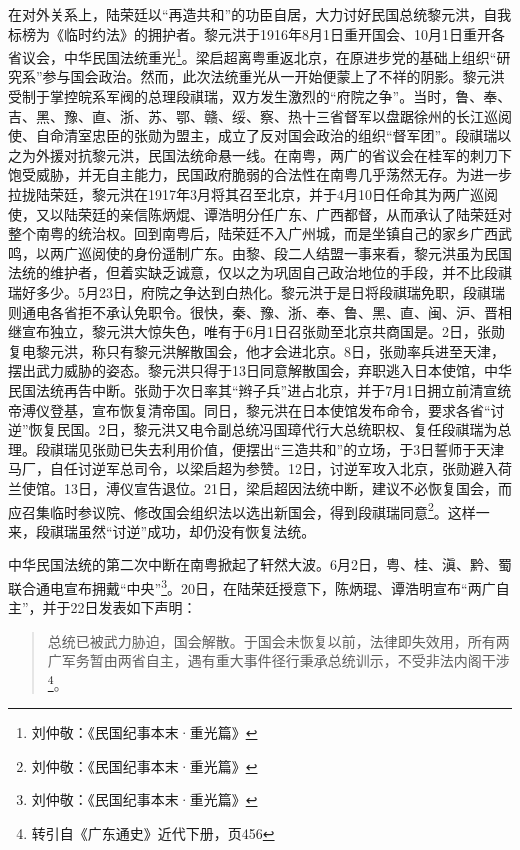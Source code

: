 在对外关系上，陆荣廷以“再造共和”的功臣自居，大力讨好民国总统黎元洪，自我标榜为《临时约法》的拥护者。黎元洪于1916年8月1日重开国会、10月1日重开各省议会，中华民国法统重光\footnote{刘仲敬：《民国纪事本末·重光篇》}。梁启超离粤重返北京，在原进步党的基础上组织“研究系”参与国会政治。然而，此次法统重光从一开始便蒙上了不祥的阴影。黎元洪受制于掌控皖系军阀的总理段祺瑞，双方发生激烈的“府院之争”。当时，鲁、奉、吉、黑、豫、直、浙、苏、鄂、赣、绥、察、热十三省督军以盘踞徐州的长江巡阅使、自命清室忠臣的张勋为盟主，成立了反对国会政治的组织“督军团”。段祺瑞以之为外援对抗黎元洪，民国法统命悬一线。在南粤，两广的省议会在桂军的刺刀下饱受威胁，并无自主能力，民国政府脆弱的合法性在南粤几乎荡然无存。为进一步拉拢陆荣廷，黎元洪在1917年3月将其召至北京，并于4月10日任命其为两广巡阅使，又以陆荣廷的亲信陈炳焜、谭浩明分任广东、广西都督，从而承认了陆荣廷对整个南粤的统治权。回到南粤后，陆荣廷不入广州城，而是坐镇自己的家乡广西武鸣，以两广巡阅使的身份遥制广东。由黎、段二人结盟一事来看，黎元洪虽为民国法统的维护者，但着实缺乏诚意，仅以之为巩固自己政治地位的手段，并不比段祺瑞好多少。5月23日，府院之争达到白热化。黎元洪于是日将段祺瑞免职，段祺瑞则通电各省拒不承认免职令。很快，秦、豫、浙、奉、鲁、黑、直、闽、沪、晋相继宣布独立，黎元洪大惊失色，唯有于6月1日召张勋至北京共商国是。2日，张勋复电黎元洪，称只有黎元洪解散国会，他才会进北京。8日，张勋率兵进至天津，摆出武力威胁的姿态。黎元洪只得于13日同意解散国会，弃职逃入日本使馆，中华民国法统再告中断。张勋于次日率其“辫子兵”进占北京，并于7月1日拥立前清宣统帝溥仪登基，宣布恢复清帝国。同日，黎元洪在日本使馆发布命令，要求各省“讨逆”恢复民国。2日，黎元洪又电令副总统冯国璋代行大总统职权、复任段祺瑞为总理。段祺瑞见张勋已失去利用价值，便摆出“三造共和”的立场，于3日誓师于天津马厂，自任讨逆军总司令，以梁启超为参赞。12日，讨逆军攻入北京，张勋避入荷兰使馆。13日，溥仪宣告退位。21日，梁启超因法统中断，建议不必恢复国会，而应召集临时参议院、修改国会组织法以选出新国会，得到段祺瑞同意\footnote{刘仲敬：《民国纪事本末·重光篇》}。这样一来，段祺瑞虽然“讨逆”成功，却仍没有恢复法统。

中华民国法统的第二次中断在南粤掀起了轩然大波。6月2日，粤、桂、滇、黔、蜀联合通电宣布拥戴“中央”\footnote{刘仲敬：《民国纪事本末·重光篇》}。20日，在陆荣廷授意下，陈炳琨、谭浩明宣布“两广自主”，并于22日发表如下声明：

\begin{quote}

总统已被武力胁迫，国会解散。于国会未恢复以前，法律即失效用，所有两广军务暂由两省自主，遇有重大事件径行秉承总统训示，不受非法内阁干涉\footnote{转引自《广东通史》近代下册，页456}。

\end{quote}

